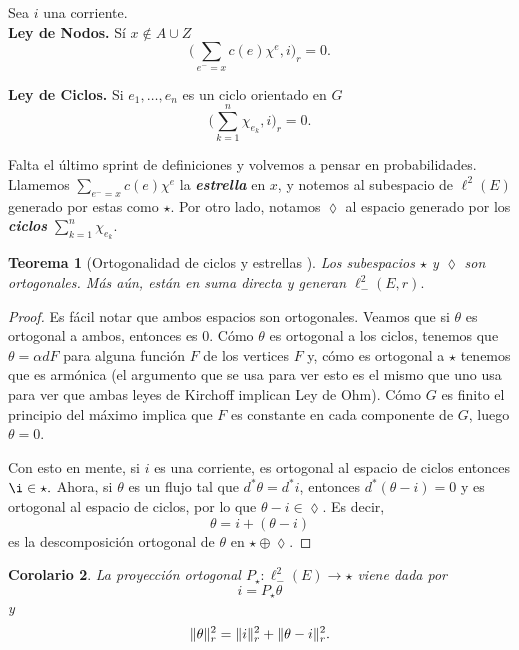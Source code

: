 \documentclass[11pt,a4paper]{article}
\DeclarePairedDelimiter{\norm}{\lVert}{\rVert}
\newcommand{\defn}[1]{\textbf{\emph{#1}}}
\numberwithin{equation}{section}
\theoremstyle{LPplain}
\newtheorem{teo}{Teorema}[section]
\newtheorem{coro}[teo]{Corolario}
\theoremstyle{LPdef}
\theoremstyle{LPrem}
\begin{document}
\noindent Sea $i$ una corriente. \\

\hspace*{1em}\textbf{Ley de Nodos.} Sí $x \notin A\cup Z$
$$\Big(\sum_{e^{-} = x} c(e)\chi^{e}, i\Big)_r = 0.$$ 

\hspace*{1em}\textbf{Ley de Ciclos.} Si $e_1, \dots, e_n$ es un ciclo orientado en $G$
$$\Big(\sum_{k = 1}^{n} \chi_{e_k}, i\Big)_r = 0.$$

Falta el último sprint de definiciones y volvemos a pensar en probabilidades. Llamemos 
$\sum_{e^{-} = x} c(e)\chi^{e}$ la \defn{estrella} en $x$, y notemos al subespacio de $\ell^{2}(E)$
generado por estas como $\star.$ Por otro lado, notamos $\lozenge$ al espacio generado por los \defn{ciclos}
$\sum_{k = 1}^{n} \chi_{e_k}$.

\begin{teo}[Ortogonalidad de ciclos y estrellas ]
  Los subespacios $\star$ y $\lozenge$ son ortogonales. Más aún, están en suma directa y generan 
  $\ell^{2}_{-}(E, r).$
\end{teo}

\begin{proof}
  Es fácil notar que ambos espacios son ortogonales. Veamos que si $\theta$ es ortogonal
  a ambos, entonces es $0$. Cómo $\theta$ es ortogonal a los ciclos, tenemos que 
  $\theta = \alpha dF$ para alguna función $F$ de los vertices $F$ y, cómo es ortogonal
  a $\star$ tenemos que es armónica (el argumento que se usa para ver esto es el mismo
  que uno usa para ver que ambas leyes de Kirchoff implican Ley de Ohm). Cómo $G$ es finito
  el principio del máximo implica que $F$ es constante en cada componente de $G$, luego $\theta = 0.$
  
  Con esto en mente, si $i$ es una corriente, es ortogonal al espacio de ciclos entonces $\i \in \star.$
  Ahora, si $\theta$ es un flujo tal que $d^{*}\theta = d^{*}i$, entonces $d^{*}(\theta - i) = 0$ y es ortogonal
  al espacio de ciclos, por lo que $\theta - i \in \lozenge.$ Es decir, 
  $$ \theta = i + (\theta - i)$$
  es la descomposición ortogonal de $\theta$ en $\star \oplus \lozenge$. 
\end{proof}

\begin{coro}
  La proyección ortogonal $P_{\star} \colon \ell^{2}_{-}(E) \to \star$ viene dada por
  $$ i = P_{\star}\theta$$
  y 
  $$\norm{\theta}_{r}^{2} = \norm{i}_{r}^{2} + \norm{\theta - i}_{r}^{2}.$$

\end{coro}
\end{document}
